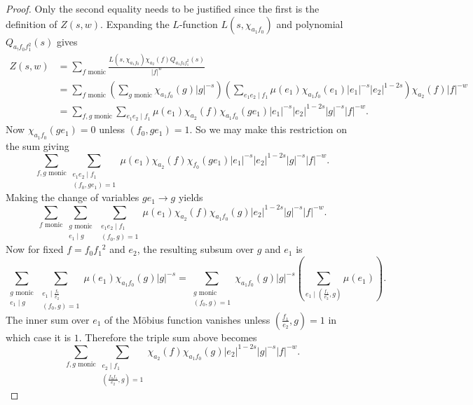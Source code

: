 \documentclass[12pt,reqno,oneside]{amsart}
\begin{document}
    \begin{proof}
        Only the second equality needs to be justified since the first is the definition of $Z(s,w)$. Expanding the $L$-function $L(s,\chi_{a_{1}f_{0}})$ and polynomial $Q_{a_{!}f_{0}f_{1}^{2}}(s)$ gives
        \begin{align*}
            Z(s,w) &= \sum_{\text{$f$ monic}}\frac{L(s,\chi_{a_{1}f_{0}})\chi_{a_{2}}(f)Q_{a_{1}f_{0}f_{1}^{2}}(s)}{|f|^{w}} \\
            &= \sum_{\text{$f$ monic}}\left(\sum_{\text{$g$ monic}}\chi_{a_{1}f_{0}}(g)|g|^{-s}\right)\left(\sum_{e_{1}e_{2} \mid f_{1}}\mu(e_{1})\chi_{a_{1}f_{0}}(e_{1})|e_{1}|^{-s}|e_{2}|^{1-2s}\right)\chi_{a_{2}}(f)|f|^{-w} \\
            &= \sum_{\text{$f,g$ monic}}\sum_{e_{1}e_{2} \mid f_{1}}\mu(e_{1})\chi_{a_{2}}(f)\chi_{a_{1}f_{0}}(ge_{1})|e_{1}|^{-s}|e_{2}|^{1-2s}|g|^{-s}|f|^{-w}.
        \end{align*}
        Now $\chi_{a_{1}f_{0}}(ge_{1}) = 0$ unless $(f_{0},ge_{1}) = 1$. So we may make this restriction on the sum giving
        \[
            \sum_{\text{$f,g$ monic}}\sum_{\substack{e_{1}e_{2} \mid f_{1} \\ (f_{0},ge_{1}) = 1}}\mu(e_{1})\chi_{a_{2}}(f)\chi_{f_{0}}(ge_{1})|e_{1}|^{-s}|e_{2}|^{1-2s}|g|^{-s}|f|^{-w}.
        \]
        Making the change of variables $ge_{1} \to g$ yields
        \[
            \sum_{\text{$f$ monic}}\sum_{\substack{\text{$g$ monic} \\ e_{1} \mid g}}\sum_{\substack{e_{1}e_{2} \mid f_{1} \\ (f_{0},g) = 1}}\mu(e_{1})\chi_{a_{2}}(f)\chi_{a_{1}f_{0}}(g)|e_{2}|^{1-2s}|g|^{-s}|f|^{-w}.
        \]
        Now for fixed $f = f_{0}f_{1}{^{2}}$ and $e_{2}$, the resulting subsum over $g$ and $e_{1}$ is
        \[
            \sum_{\substack{\text{$g$ monic} \\ e_{1} \mid g}}\sum_{\substack{e_{1} \mid \frac{f_{1}}{e_{2}} \\ (f_{0},g) = 1}}\mu(e_{1})\chi_{a_{1}f_{0}}(g)|g|^{-s} = \sum_{\substack{\text{$g$ monic} \\ (f_{0},g) = 1}}\chi_{a_{1}f_{0}}(g)|g|^{-s}\left(\sum_{e_{1} \mid \left(\frac{f_{1}}{e_{2}},g\right)}\mu(e_{1})\right).
        \]
        The inner sum over $e_{1}$ of the M\"obius function vanishes unless $\left(\frac{f_{1}}{e_{2}},g\right) = 1$ in which case it is $1$. Therefore the triple sum above becomes
        \[
            \sum_{\text{$f,g$ monic}}\sum_{\substack{e_{2} \mid f_{1} \\ \left(\frac{f_{0}f_{1}}{e_{2}},g\right) = 1}}\chi_{a_{2}}(f)\chi_{a_{1}f_{0}}(g)|e_{2}|^{1-2s}|g|^{-s}|f|^{-w}.
\]
\end{proof}
\end{document}
